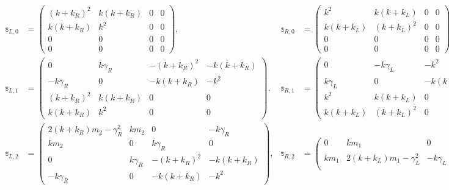 \begin{equation}
  \begin{aligned}
    \mathbb{s}_{L,0} &=
    \left(
    \begin{array}{cccc}
      (k+k_R)^2 & k (k+k_R) & 0 & 0 \\
      k (k+k_R) & k^2 & 0 & 0 \\
      0 & 0 & 0 & 0 \\
      0 & 0 & 0 & 0
    \end{array}
    \right),
    &
    \mathbb{s}_{R,0} & =
    \left(
    \begin{array}{cccc}
      k^2 & k (k+k_L) & 0 & 0 \\
      k (k+k_L) & (k+k_L)^2 & 0 & 0 \\
      0 & 0 & 0 & 0 \\
      0 & 0 & 0 & 0
    \end{array}
    \right),
    \\
    \mathbb{s}_{L,1} &= \left(
    \begin{array}{cccc}
      0 & k \gamma_R & -(k+k_R)^2 & -k (k+k_R) \\
      -k \gamma_R & 0 & -k (k+k_R) & -k^2 \\
      (k+k_R)^2 & k (k+k_R) & 0 & 0 \\
      k (k+k_R) & k^2 & 0 & 0
    \end{array}
    \right),
    &
    \mathbb{s}_{R,1} & = \left(
    \begin{array}{cccc}
      0 & -k \gamma_L & -k^2 & -k (k+k_L) \\
      k \gamma_L & 0 & -k (k+k_L) & -(k+k_L)^2 \\
      k^2 & k (k+k_L) & 0 & 0 \\
      k (k+k_L) & (k+k_L)^2 & 0 & 0
    \end{array}
    \right),
    \\
    \mathbb{s}_{L,2} &= \left(
    \begin{array}{cccc}
      2 (k+k_R) m_2-\gamma_R^2 & k m_2 & 0 & -k \gamma_R \\
      k m_2 & 0 & k \gamma_R & 0 \\
      0 & k \gamma_R & -(k+k_R)^2 & -k (k+k_R) \\
      -k \gamma_R & 0 & -k (k+k_R) & -k^2
    \end{array}
    \right),
    &
    \mathbb{s}_{R,2} & = \left(
    \begin{array}{cccc}
      0 & k m_1 & 0 & k \gamma_L \\
      k m_1 & 2 (k+k_L) m_1-\gamma_L^2 & -k \gamma_L & 0 \\

\end{array}
\end{aligned}
\end{equation}
